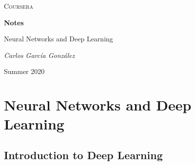 \documentclass[11pt]{report}
\makeatletter
\renewcommand\tableofcontents{
  \null\hfill\textbf{\Large\contentsname}\hfill\null\par
  \@mkboth{\MakeUppercase\contentsname}{\MakeUppercase\contentsname}
  \@starttoc{toc}
}
\makeatother
\begin{document}
\begin{titlepage}
	\centering
	{\scshape\LARGE Coursera \par}
	\vspace{6.5cm}
	{\LARGE \textbf{Notes}\par}
	{\LARGE Neural Networks and Deep Learning \par}
	\vfill
	{\Large\itshape Carlos Garc\'ia Gonz\'alez\par}
	\vspace{1cm}
	{\large Summer 2020 \par}
\end{titlepage}

\tableofcontents
{}
\newpage
\chapter{Neural Networks and Deep Learning}

\section{Introduction to Deep Learning}
\end{document}
